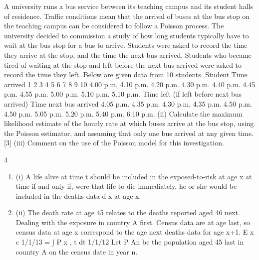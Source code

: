 \documentclass[a4paper,12pt]{article}
\begin{document}
\begin{enumerate}
A university runs a bus service between its teaching campus and its student halls of residence. Traffic conditions mean that the arrival of buses at the bus stop on the teaching campus can be considered to follow a Poisson process.
The university decided to commission a study of how long students typically have to wait at the bus stop for a bus to arrive. Students were asked to record the time they arrive at the stop, and the time the next bus arrived. Students who became tired of
waiting at the stop and left before the next bus arrived were asked to record the time they left. Below are given data from 10 students.
Student Time arrived
1
2
3
4
5
6
7
8
9
10 4.00 p.m.
4.10 p.m.
4.20 p.m.
4.30 p.m.
4.40 p.m.
4.45 p.m.
4.55 p.m.
5.00 p.m.
5.10 p.m.
5.10 p.m.
Time left (if
left before
next bus
arrived)
Time next
bus arrived
4.05 p.m.
4.35 p.m.
4.30 p.m.
4.35 p.m.
4.50 p.m.
4.50 p.m.
5.05 p.m.
5.20 p.m.
5.40 p.m.
6.10 p.m.
(ii) Calculate the maximum likelihood estimate of the hourly rate at which buses
arrive at the bus stop, using the Poisson estimator, and assuming that only one
bus arrived at any given time.
[3]
(iii) Comment on the use of the Poisson model for this investigation.


\newpage

4

\begin{enumerate}
\item (i) A life alive at time t should be included in the exposed-to-risk at age x at time if and only if, were that life to die immediately, he or she would be included in the deaths data d x at age x.
\item (ii) The death rate at age 45 relates to the deaths reported aged 46 next.
Dealing with the exposure in country A first. Census data are at age last, so census data at age x correspond to the age next deaths data for age x+1.
E x c
1/1/13
=
∫
P x , t dt
1/1/12
Let P An be the population aged 45 last in country A on the census date in
year n.
\end{enumerate}


\end{enumerate}
\end{document}
